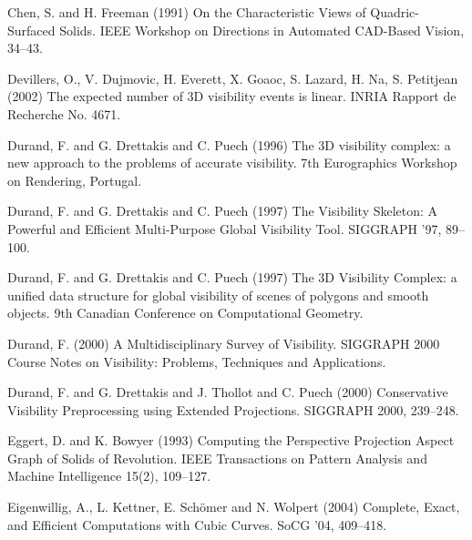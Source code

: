 \documentclass[10pt,twocolumn]{article}
\begin{document}

% 
\begin{thebibliography}{}

Chen, S. and H. Freeman (1991)
On the Characteristic Views of Quadric-Surfaced Solids.
IEEE Workshop on Directions in Automated CAD-Based Vision, 34--43.

Devillers, O., V. Dujmovic, H. Everett, X. Goaoc, S. Lazard, H. Na, 
S. Petitjean (2002)
The expected number of 3D visibility events is linear.
INRIA Rapport de Recherche No. 4671.

Durand, F. and G. Drettakis and C. Puech (1996)
The 3D visibility complex: a new approach to the problems of accurate
visibility.
7th Eurographics Workshop on Rendering, Portugal.

Durand, F. and G. Drettakis and C. Puech (1997)
The Visibility Skeleton: A Powerful and Efficient Multi-Purpose Global
Visibility Tool.
SIGGRAPH '97, 89--100.

Durand, F. and G. Drettakis and C. Puech (1997)
The 3D Visibility Complex: a unified data structure for global
visibility of scenes of polygons and smooth objects.
9th Canadian Conference on Computational Geometry.


Durand, F. (2000)
A Multidisciplinary Survey of Visibility.
SIGGRAPH 2000 Course Notes on Visibility: Problems, Techniques
and Applications.

Durand, F. and G. Drettakis and J. Thollot and C. Puech (2000)
Conservative Visibility Preprocessing using Extended Projections.
SIGGRAPH 2000, 239--248.

Eggert, D. and K. Bowyer (1993)
Computing the Perspective Projection Aspect Graph of Solids of Revolution.
IEEE Transactions on Pattern Analysis and Machine Intelligence 15(2), 109--127.

Eigenwillig, A., L. Kettner, E. Sch\"omer and N. Wolpert (2004)
Complete, Exact, and Efficient Computations with Cubic Curves.
SoCG '04, 409--418.


\end{thebibliography}
\end{document}
